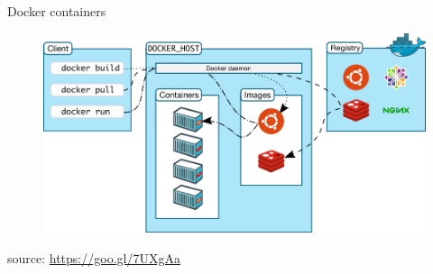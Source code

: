 \begin{frame}{Docker containers}
{	}
	\only<2>
	{
		\begin{figure}
			\centering{}
			\includegraphics[scale=0.35]{images/docker-architecture.png}
		\end{figure}
		\begin{flushright}
			\tiny{source: \url{https://goo.gl/7UXgAa}}
		\end{flushright}
	}
\end{frame}